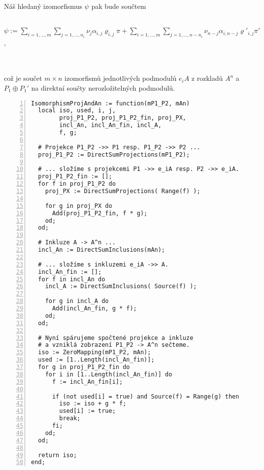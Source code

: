       Náš hledaný izomorfismus $\psi$ pak bude součtem \\\\
      \centerline{$
        \psi:=          
          \sum_{i=1,\ldots,m}\sum_{j=1,\ldots,n_i}\nu_j\alpha_{i,j}\varrho_{i,j}\pi
          +
          \sum_{i=1,\ldots,m}\sum_{j=1,\ldots,n-n_i}\nu_{n-j}\alpha_{i,n-j}\varrho'_{i,j}\pi'
      $,} \\\\
      což je součet $m\times n$ izomorfismů jednotlivých podmodulů $e_iA$ z rozkladů $A^n$ 
      a $P_1\oplus P_1'$ na direktní součty nerozložitelných podmodulů.

      \begin{Verbatim}[frame=single,numbers=left]
IsomorphismProjAndAn := function(mP1_P2, mAn)
  local iso, used, i, j,
        proj_P1_P2, proj_P1_P2_fin, proj_PX,
        incl_An, incl_An_fin, incl_A,
        f, g;

  # Projekce P1_P2 ->> P1 resp. P1_P2 ->> P2 ...
  proj_P1_P2 := DirectSumProjections(mP1_P2);

  # ... složíme s projekcemi P1 ->> e_iA resp. P2 ->> e_iA.
  proj_P1_P2_fin := [];
  for f in proj_P1_P2 do
    proj_PX := DirectSumProjections( Range(f) );

    for g in proj_PX do
      Add(proj_P1_P2_fin, f * g);
    od;
  od;

  # Inkluze A -> A^n ...
  incl_An := DirectSumInclusions(mAn);

  # ... složíme s inkluzemi e_iA ->> A.
  incl_An_fin := [];
  for f in incl_An do
    incl_A := DirectSumInclusions( Source(f) );

    for g in incl_A do
      Add(incl_An_fin, g * f);
    od;
  od;

  # Nyní spárujeme spočtené projekce a inkluze
  # a vzniklá zobrazení P1_P2 -> A^n sečteme.
  iso := ZeroMapping(mP1_P2, mAn);
  used := [1..Length(incl_An_fin)];
  for g in proj_P1_P2_fin do
    for i in [1..Length(incl_An_fin)] do
      f := incl_An_fin[i];

      if (not used[i] = true) and Source(f) = Range(g) then
        iso := iso + g * f;
        used[i] := true;
        break;
      fi;
    od;
  od;

  return iso;
end;    
      \end{Verbatim}
      

